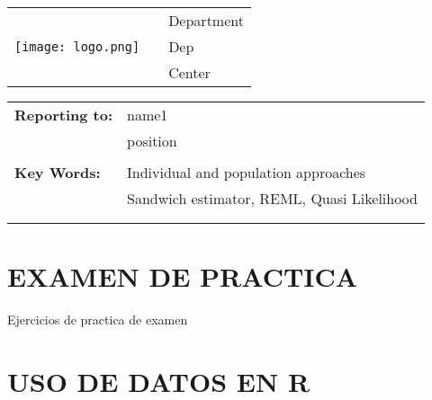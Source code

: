 \documentclass[letterpaper,11pt]{article}\usepackage[]{graphicx}\usepackage[]{color}
\begin{document}


\vspace{-25pt}%

\begin{tabular}[t]{lp{1in}l}
	\multirow{5}{*}{\texttt{[image: logo.png]}} && Department \leavevmode  \\
																								&& Dep \\
																								&& Center\\
\end{tabular}


\leavevmode \newline \vspace{15pt} \newline\vspace{0.015in}

\begin{tabular}[h!]{p{2in} p{10in}}
	\rule{0pt}{4ex}\textbf{Reporting to:}          & name1  \\
																							   & position \\
                                                 & \\
	\rule{0pt}{4ex}\textbf{Key Words:}  					 & Individual and population approaches\\
																								 & Sandwich estimator, REML, Quasi Likelihood \\
 \mbox{$\quad$} \\
 \mbox{$\quad$} \\
\end{tabular}

\newpage
\noindent 



\section*{EXAMEN DE PRACTICA}

Ejercicios de practica de examen

\section{USO DE DATOS EN R}
\end{document}
